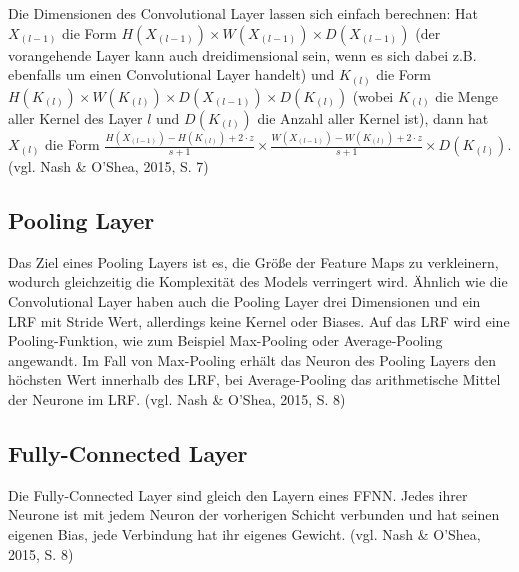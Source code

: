 \documentclass[a4paper,12pt,ngerman,oneside]{scrreprt}	%
\newcommand{\cnnKlein}[1]{(vgl. Nash \& O'Shea, 2015, S. {#1})}
\begin{document}
			Die Dimensionen des Convolutional Layer lassen sich einfach berechnen: Hat $X_{(l-1)}$ die Form $H({X_{(l-1)}}) \times W({X_{(l-1)}}) \times D({X_{(l-1)}})$ (der vorangehende Layer kann auch dreidimensional sein, wenn es sich dabei z.B. ebenfalls um einen Convolutional Layer handelt) und $K_{(l)}$ die Form $H({K_{(l)}}) \times W({K_{(l)}}) \times D({X_{(l-1)}}) \times D({K_{(l)}})$ (wobei $K_{(l)}$ die Menge aller Kernel des Layer $l$ und $D({K_{(l)}})$ die Anzahl aller Kernel ist), dann hat $X_{(l)}$ die Form $\frac{ H(X_{(l-1)}) - H(K_{(l)}) + 2 \cdot z}{s+1} \times \frac{ W(X_{(l-1)}) - W(K_{(l)}) + 2 \cdot z}{s+1} \times D({K_{(l)}})$. \cnnKlein{7} 
			
			
			
			\subsection{Pooling Layer}
			Das Ziel eines Pooling Layers ist es, die Größe der Feature Maps zu verkleinern, wodurch gleichzeitig die Komplexität des Models verringert wird. Ähnlich wie die Convolutional Layer haben auch die Pooling Layer drei Dimensionen und ein LRF mit Stride Wert, allerdings keine Kernel oder Biases. Auf das LRF wird eine Pooling-Funktion, wie zum Beispiel Max-Pooling oder Average-Pooling angewandt. Im Fall von Max-Pooling erhält das Neuron des Pooling Layers den höchsten Wert innerhalb des LRF, bei Average-Pooling das arithmetische Mittel der Neurone im LRF. \cnnKlein{8}
			\subsection{Fully-Connected Layer}
			Die Fully-Connected Layer sind gleich den Layern eines FFNN. Jedes ihrer Neurone ist mit jedem Neuron der vorherigen Schicht verbunden und hat seinen eigenen Bias, jede Verbindung hat ihr eigenes Gewicht. \cnnKlein{8}
\end{document}
